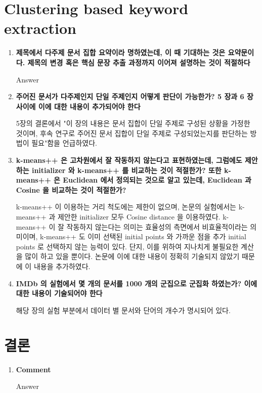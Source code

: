 \documentclass[11pt]{article}
\begin{document}
\section{Clustering based keyword extraction}
\begin{enumerate}
\item \textbf{제목에서 다주제 문서 집합 요약이라 명하였는데, 이 때 기대하는 것은 요약문이다. 제목의 변경 혹은 핵심 문장 추출 과정까지 이어져 설명하는 것이 적절하다}

Answer

\item \textbf{주어진 문서가 다주제인지 단일 주제인지 어떻게 판단이 가능한가? 5 장과 6 장 사이에 이에 대한 내용이 추가되어야 한다}

5장의 결론에서 "이 장의 내용은 문서 집합이 단일 주제로 구성된 상황을 가정한 것이며, 후속 연구로 주어진 문서 집합이 단일 주제로 구성되었는지를 판단하는 방법이 필요"함을 언급하였다.


\item \textbf{k-means++ 은 고차원에서 잘 작동하지 않는다고 표현하였는데, 그럼에도 제안하는 initializer 와 k-means++ 를 비교하는 것이 적절한가? 또한 k-means++ 은 Euclidean 에서 정의되는 것으로 알고 있는데, Euclidean 과 Cosine 을 비교하는 것이 적절한가?}

k-means++ 이 이용하는 거리 척도에는 제한이 없으며, 논문의 실험에서는 k-means++ 과 제안한 initializer  모두 Cosine distance 을 이용하였다.
k-means++ 이 잘 작동하지 않는다는 의미는 효율성의 측면에서 비효율적이라는 의미이며, k-means++ 도 이미 선택된 initial points 와 가까운 점을 추가 initial points 로 선택하지 않는 능력이 있다.
단지, 이를 위하여 지나치게 불필요한 계산을 많이 하고 있을 뿐이다.
논문에 이에 대한 내용이 정확히 기술되지 않았기 때문에 이 내용을 추가하였다.


\item \textbf{IMDb 의 실험에서 몇 개의 문서를 1000 개의 군집으로 군집화 하였는가? 이에 대한 내용이 기술되어야 한다}

해당 장의 실험 부분에서 데이터 별 문서와 단어의 개수가 명시되어 있다.

\end{enumerate}


\section{결론}
\begin{enumerate}
\item \textbf{Comment}

Answer

\end{enumerate}
\end{document}
